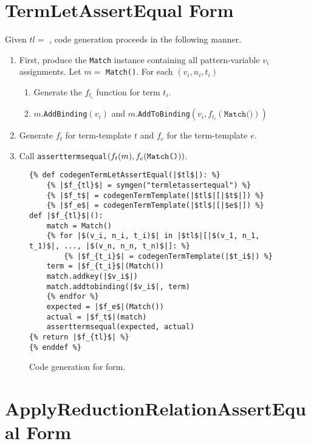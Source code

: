 \section{TermLetAssertEqual Form}

Given $tl=$ \TermLetAssertEqual, code generation proceeds in the following manner.
\begin{enumerate}
	\item First, produce the \texttt{Match} instance containing all pattern-variable $v_i$ assignments. Let $m=$ \texttt{Match()}. For each $(v_i, n_i, t_i)$
	\begin{enumerate}
	\item Generate the $f_{t_i}$ function for term $t_i$.
	\item $m$.\texttt{AddBinding}$(v_i)$ and $m$.\texttt{AddToBinding}$(v_i, f_{t_i}(\texttt{Match()}))$
	\end{enumerate}
\item Generate $f_t$ for term-template $t$ and $f_e$ for the term-template $e$.
\item Call \texttt{asserttermsequal}$(f_t(m), f_e(\texttt{\texttt{Match()}}))$.
\end{enumerate}

\begin{figure}[htb]
\begin{verbatim}
{% def codegenTermLetAssertEqual(|$tl$|): %}
	{% |$f_{tl}$| = symgen("termletassertequal") %}
	{% |$f_t$| = codegenTermTemplate(|$tl$|[|$t$|]) %}
	{% |$f_e$| = codegenTermTemplate(|$tl$|[|$e$|]) %}
def |$f_{tl}$|():
	match = Match()
	{% for |$(v_i, n_i, t_i)$| in |$tl$|[|$(v_1, n_1, t_1)$|, ..., |$(v_n, n_n, t_n)$|]: %}
		{% |$f_{t_i}$| = codegenTermTemplate(|$t_i$|) %}
	term = |$f_{t_i}$|(Match())
	match.addkey(|$v_i$|)
	match.addtobinding(|$v_i$|, term)
	{% endfor %}
	expected = |$f_e$|(Match())
	actual = |$f_t$|(match)
	asserttermsequal(expected, actual)
{% return |$f_{tl}$| %}
{% enddef %}
\end{verbatim}
\caption{Code generation for \TermLetAssertEqualNoArgs \space form.}
\label{codegen-termlet}
\end{figure}


\section{ApplyReductionRelationAssertEqual Form}

